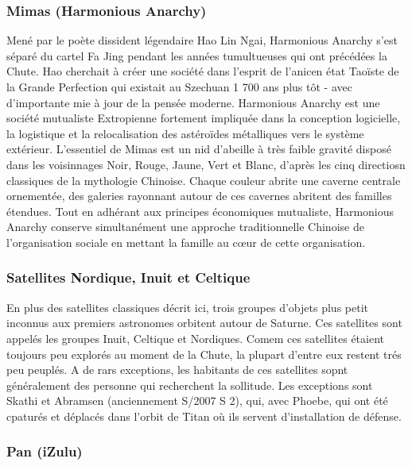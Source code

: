 \subsubsection{Mimas (Harmonious Anarchy)} \label{sec:mimas-harm-anarchy} 

Mené par le poète dissident légendaire Hao Lin Ngai, Harmonious Anarchy s'est séparé du cartel Fa Jing pendant les années tumultueuses qui ont précédées la Chute. Hao cherchait à créer une société dans l'esprit de l'anicen état Taoïste de la Grande Perfection qui existait au Szechuan 1 700 ans plus tôt - avec d'importante mie à jour de la pensée moderne. Harmonious Anarchy est une société mutualiste Extropienne fortement impliquée dans la conception logicielle, la logistique et la relocalisation des astéroïdes métalliques vers le système extérieur. L'essentiel de Mimas est un nid d'abeille à très faible gravité disposé dans les voisinnages Noir, Rouge, Jaune, Vert et Blanc, d'après les cinq directiosn classiques de la mythologie Chinoise. Chaque couleur abrite une caverne centrale ornementée, des galeries rayonnant autour de ces cavernes abritent des familles étendues. Tout en adhérant aux principes économiques mutualiste, Harmonious Anarchy conserve simultanément une approche traditionnelle Chinoise de l'organisation sociale en mettant la famille au cœur de cette organisation. 

\subsubsection{Satellites Nordique, Inuit et Celtique} \label{sec:norse-inuit-gallic} 

En plus des satellites classiques décrit ici, trois groupes d'objets plus petit inconnus aux premiers astronomes orbitent autour de Saturne. Ces satellites sont appelés les groupes Inuit, Celtique et Nordiques. Comem ces satellites étaient toujours peu explorés au moment de la Chute, la plupart d'entre eux restent trés peu peuplés. A de rars exceptions, les habitants de ces satellites sopnt généralement des personne qui recherchent la sollitude. Les exceptions sont Skathi et Abramsen (anciennement S/2007 S 2), qui, avec Phoebe, qui ont été cpaturés et déplacés dans l'orbit de Titan où ils servent d'installation de défense. 

\subsubsection{Pan (iZulu)} \label{sec:pan-izulu} 

